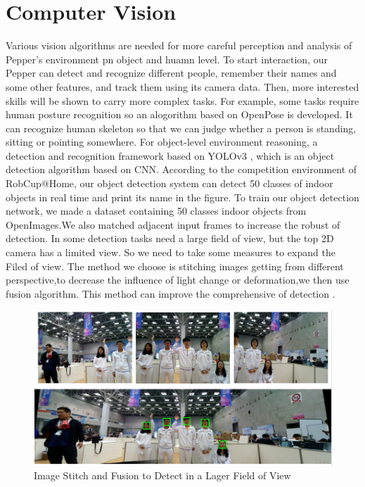 \section{Computer Vision}
\label{sec:vision}
Various vision algorithms are needed for more careful perception and analysis of Pepper's environment pn object and huamn level. 
To start interaction, our Pepper can detect and recognize different people, remember their names and some other features, and track them using its camera data. 
Then, more interested skills will be shown to carry more complex tasks. For example, some tasks require human posture recognition so an alogorithm based on OpenPose \cite{Cao_2017_CVPR} is developed. 
It can recognize human skeleton so that we can judge whether a person is standing, sitting or pointing somewhere. For object-level environment reasoning, a detection and recognition framework based on YOLOv3 \cite{Redmon2018YOLOv3AI}, which is an object detection algorithm based on CNN.
According to the competition environment of RobCup@Home, our object detection system can detect 50 classes of indoor objects in real time and print its name in the figure.
To train our object detection network, we made a dataset containing 50 classes indoor objects from OpenImages.We also matched adjacent input frames to increase the robust of detection.
In some detection tasks need a large field of view, but the top 2D camera has a limited view. So we need to take some measures to expand the Filed of view.
The method we choose is stitching images getting from different perspective,to decrease the influence of light change or deformation,we then use fusion algorithm. This method can improve the comprehensive of detection .
\begin{figure}[h!]
\centering
\includegraphics[width=1.\textwidth]{figs/vision1.png}
\caption{Image Stitch and Fusion to Detect in a Lager Field of View}
\label{fig:vision1}
\end{figure}
